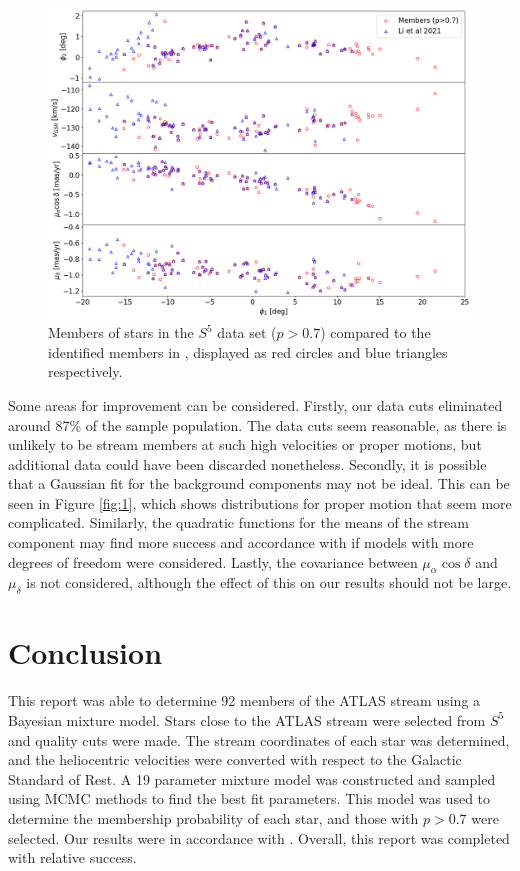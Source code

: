 \documentclass{article}
\begin{document}
\begin{figure}[H]
\begin{center}
    \includegraphics[width=\textwidth]{figures/fig 4.png}
\end{center}
    \vspace{-2em}
    \caption{Members of stars in the $S^5$ data set ($p>0.7$) compared to the identified members in \citet{2021ApJ...911..149L}, displayed as red circles and blue triangles respectively.}
    \label{fig:4}
\end{figure}

Some areas for improvement can be considered. Firstly, our data cuts eliminated around 87\% of the sample population. The data cuts seem reasonable, as there is unlikely to be stream members at such high velocities or proper motions, but additional data could have been discarded nonetheless. Secondly, it is possible that a Gaussian fit for the background components may not be ideal. This can be seen in Figure \ref{fig:1}, which shows distributions for proper motion that seem more complicated. Similarly, the quadratic functions for the means of the stream component may find more success and accordance with \citet{2021ApJ...911..149L} if models with more degrees of freedom were considered. Lastly, the covariance between $\mu_\alpha\cos\delta$ and $\mu_\delta$ is not considered, although the effect of this on our results should not be large.

\section{Conclusion}

This report was able to determine 92 members of the ATLAS stream using a Bayesian mixture model. Stars close to the ATLAS stream were selected from $S^5$ and quality cuts were made. The stream coordinates of each star was determined, and the heliocentric velocities were converted with respect to the Galactic Standard of Rest. A 19 parameter mixture model was constructed and sampled using MCMC methods to find the best fit parameters. This model was used to determine the membership probability of each star, and those with $p>0.7$ were selected. Our results were in accordance with \citet{2021ApJ...911..149L}. Overall, this report was completed with relative success.


\end{document}
